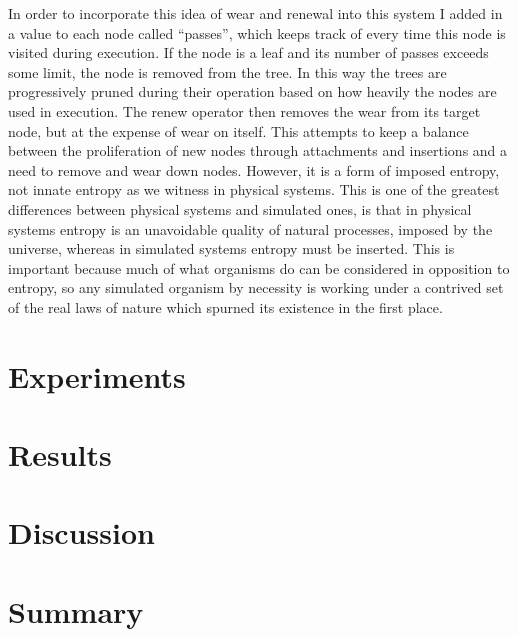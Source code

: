 \documentclass[12pt]{article}
\begin{document}
In order to incorporate this idea of wear and renewal into this system I added in a value to each node called ``passes'', which keeps track of every time this node is visited during execution.  If the node is  a leaf and its number of passes exceeds some limit, the node is removed from the tree.  In this way the trees are progressively pruned during their operation based on how heavily the nodes are used in execution.  The renew operator then removes the wear from its target node, but at the expense of wear on itself.  This attempts to keep a balance between the proliferation of new nodes through attachments and insertions and a need to remove and wear down nodes.  However, it is a form of imposed entropy, not innate entropy as we witness in physical systems.  This is one of the greatest differences between physical systems and simulated ones, is that in physical systems entropy is an unavoidable quality of natural processes, imposed by the universe, whereas in simulated systems entropy must be inserted.  This is important because much of what organisms do can be considered in opposition to entropy, so any simulated organism by necessity is working under a contrived set of the real laws of nature which spurned its existence in the first place.  

\section{Experiments}



\section{Results}



\section{Discussion}



\section{Summary}





\end{document}
